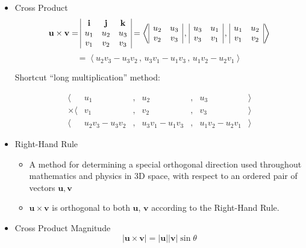 \documentclass[12pt]{article}
\renewcommand{\vec}[1]{\mathbf{#1}}
\newcommand{\veci}{\mathbf{i}}
\newcommand{\vecj}{\mathbf{j}}
\newcommand{\veck}{\mathbf{k}}
\newcommand{\<}{\left<}
\renewcommand{\>}{\right>}
\begin{document}
\begin{itemize}
\begin{itemize}
      \end{itemize}
    \item Cross Product
\[
    \vec{u} \times \vec{v} = 
\begin{array}{|c c c|}
\veci & \vecj & \veck \\
u_1 & u_2 & u_3 \\
v_1 & v_2 & v_3 \\
\end{array}
    =
    \<
\begin{array}{|c c|}
u_2 & u_3 \\
v_2 & v_3 \\
\end{array}
    \,,\,
\begin{array}{|c c|}
u_3 & u_1 \\
v_3 & v_1 \\
\end{array}
    \,,\,
\begin{array}{|c c|}
u_1 & u_2 \\
v_1 & v_2 \\
\end{array}
    \>
\]
    \[
    =
    \<u_2v_3-u_3v_2\,,\,u_3v_1-u_1v_3\,,\,u_1v_2-u_2v_1\>
    \]
    
    Shortcut ``long multiplication'' method:
    
    \[
\begin{array}{rcccccl}
\langle& u_1 & , & u_2 & , & u_3 & \rangle \\
\times\langle & v_1 & , & v_2 & , & v_3 & \rangle \\\hline
\langle & u_2v_3-u_3v_2 & , & u_3v_1-u_1v_3 & , & u_1v_2-u_2v_1 & \rangle
\end{array}
    \]

    \item Right-Hand Rule
      \begin{itemize}
      \item A method for determining a special orthogonal direction used throughout mathematics and physics in 3D space, with respect to an ordered pair of vectors $\vec{u},\vec{v}$
      \item $\vec{u}\times\vec{v}$ is orthogonal to both $\vec{u}$, $\vec{v}$ according to the Right-Hand Rule.
      \end{itemize}

    \newpage

    \item Cross Product Magnitude
      \[|\vec{u}\times\vec{v}|=|\vec{u}||\vec{v}|\sin\theta\]


\end{itemize}
\end{document}
